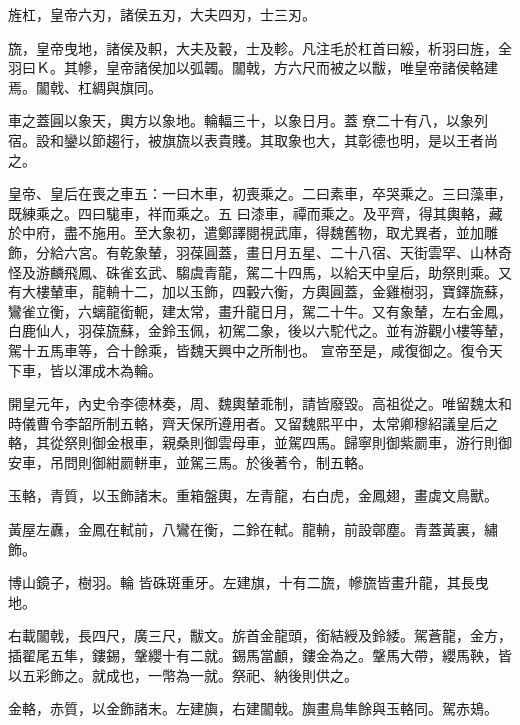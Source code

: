 \begin{pinyinscope}
 旌杠，皇帝六刃，諸侯五刃，大夫四刃，士三刃。



 旒，皇帝曳地，諸侯及軹，大夫及轂，士及軫。凡注毛於杠首曰綏，析羽曰旌，全羽曰Ｋ。其幓，皇帝諸侯加以弧韣。闟戟，方六尺而被之以黻，唯皇帝諸侯輅建焉。闟戟、杠綢與旗同。



 車之蓋圓以象天，輿方以象地。輪輻三十，以象日月。蓋尞二十有八，以象列宿。設和鑾以節趨行，被旗旒以表貴賤。其取象也大，其彰德也明，是以王者尚之。



 皇帝、皇后在喪之車五：一曰木車，初喪乘之。二曰素車，卒哭乘之。三曰藻車，既練乘之。四曰駹車，祥而乘之。五
 曰漆車，禫而乘之。及平齊，得其輿輅，藏於中府，盡不施用。至大象初，遣鄭譯閱視武庫，得魏舊物，取尤異者，並加雕飾，分給六宮。有乾象輦，羽葆圓蓋，畫日月五星、二十八宿、天街雲罕、山林奇怪及游麟飛鳳、硃雀玄武、騶虞青龍，駕二十四馬，以給天中皇后，助祭則乘。又有大樓輦車，龍輈十二，加以玉飾，四轂六衡，方輿圓蓋，金雞樹羽，寶鐸旒蘇，鸞雀立衡，六螭龍銜軛，建太常，畫升龍日月，駕二十牛。又有象輦，左右金鳳，白鹿仙人，羽葆旒蘇，金鈴玉佩，初駕二象，後以六駝代之。並有游觀小樓等輦，駕十五馬車等，合十餘乘，皆魏天興中之所制也。
 宣帝至是，咸復御之。復令天下車，皆以渾成木為輪。



 開皇元年，內史令李德林奏，周、魏輿輦乖制，請皆廢毀。高祖從之。唯留魏太和時儀曹令李韶所制五輅，齊天保所遵用者。又留魏熙平中，太常卿穆紹議皇后之輅，其從祭則御金根車，親桑則御雲母車，並駕四馬。歸寧則御紫罽車，游行則御安車，吊問則御紺罽軿車，並駕三馬。於後著令，制五輅。



 玉輅，青質，以玉飾諸末。重箱盤輿，左青龍，右白虎，金鳳翅，畫虡文鳥獸。



 黃屋左纛，金鳳在軾前，八鸞在衡，二鈴在軾。龍輈，前設鄣塵。青蓋黃裏，繡飾。



 博山鏡子，樹羽。輪
 皆硃斑重牙。左建旗，十有二旒，幓旒皆畫升龍，其長曳地。



 右載闟戟，長四尺，廣三尺，黻文。旂首金龍頭，銜結綬及鈴緌。駕蒼龍，金方，插翟尾五隼，鏤錫，鞶纓十有二就。錫馬當顱，鏤金為之。鞶馬大帶，纓馬鞅，皆以五彩飾之。就成也，一幣為一就。祭祀、納後則供之。



 金輅，赤質，以金飾諸末。左建旟，右建闟戟。旟畫鳥隼餘與玉輅同。駕赤鳷。




\end{pinyinscope}
